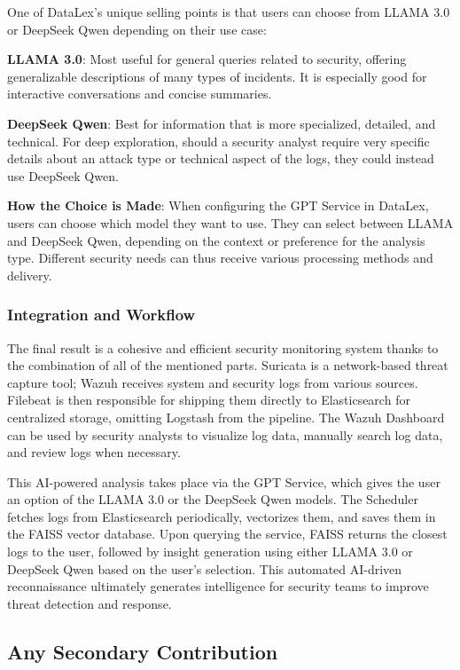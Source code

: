 One of DataLex's unique selling points is that users can choose from LLAMA 3.0 or DeepSeek Qwen depending on their use case:

\textbf{LLAMA 3.0}: Most useful for general queries related to security, offering generalizable descriptions of many types of incidents. It is especially good for interactive conversations and concise summaries.

\textbf{DeepSeek Qwen}: Best for information that is more specialized, detailed, and technical. For deep exploration, should a security analyst require very specific details about an attack type or technical aspect of the logs, they could instead use DeepSeek Qwen.

\textbf{How the Choice is Made}: When configuring the GPT Service in DataLex, users can choose which model they want to use. They can select between LLAMA and DeepSeek Qwen, depending on the context or preference for the analysis type. Different security needs can thus receive various processing methods and delivery.

\subsubsection{Integration and Workflow}
\label{subsubsec_integration_and_workflow}

The final result is a cohesive and efficient security monitoring system thanks to the combination of all of the mentioned parts. Suricata is a network-based threat capture tool; Wazuh receives system and security logs from various sources. Filebeat is then responsible for shipping them directly to Elasticsearch for centralized storage, omitting Logstash from the pipeline. The Wazuh Dashboard can be used by security analysts to visualize log data, manually search log data, and review logs when necessary.

This AI-powered analysis takes place via the GPT Service, which gives the user an option of the LLAMA 3.0 or the DeepSeek Qwen models. The Scheduler fetches logs from Elasticsearch periodically, vectorizes them, and saves them in the FAISS vector database. Upon querying the service, FAISS returns the closest logs to the user, followed by insight generation using either LLAMA 3.0 or DeepSeek Qwen based on the user's selection. This automated AI-driven reconnaissance ultimately generates intelligence for security teams to improve threat detection and response.

\subsection{Any Secondary Contribution}
\label{subsec_secondary_contribution}

